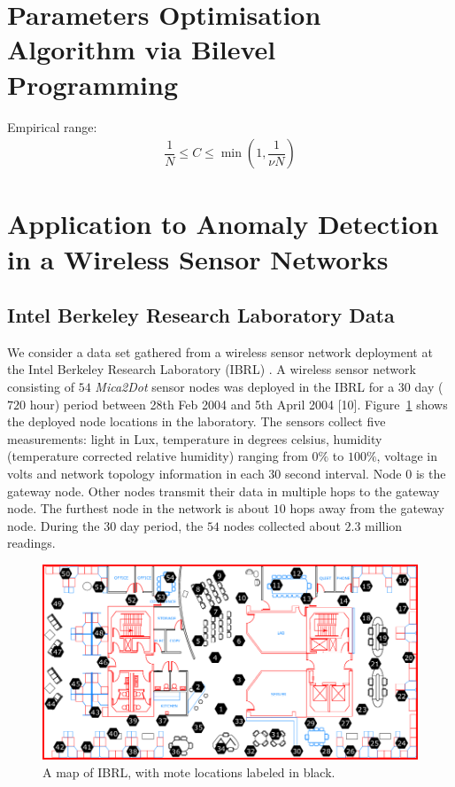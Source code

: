 \documentclass[3p,times]{elsarticle}
\begin{document}
\section{Parameters Optimisation Algorithm via Bilevel Programming}

\cite{theissler2013autonomously}

Empirical range:
\begin{align}
\dfrac{1}{N} \le C \le \min \left( 1, \dfrac{1}{\nu N} \right)
\end{align}

\section{Application to Anomaly Detection in a Wireless Sensor Networks}

\subsection{Intel Berkeley Research Laboratory Data}

We consider a data set gathered from a wireless sensor network deployment at the Intel Berkeley Research Laboratory (IBRL) \cite{Buonadonna2005}. A wireless sensor network consisting of $54$ \emph{Mica2Dot} sensor nodes was deployed in the IBRL for a $30$ day ($720$ hour) period between 28th Feb 2004 and 5th April 2004 [10]. Figure~\ref{fig:ibrl_wsn} shows the deployed node locations in the laboratory. The sensors collect five measurements: light in Lux, temperature in degrees celsius, humidity (temperature corrected relative humidity) ranging from $0\%$ to $100\%$, voltage in volts and network topology information in each $30$ second interval. Node $0$ is the gateway node. Other nodes transmit their data in multiple hops to the gateway node. The furthest node in the network is about $10$ hops away from the gateway node. During the $30$ day period, the $54$ nodes collected about $2.3$ million readings.

\begin{figure}[H]
\centering
\includegraphics[scale=.3]{Pictures/ibrl_wsn}
\caption{A map of IBRL, with mote locations labeled in black.}
\label{fig:ibrl_wsn}
\end{figure}
\end{document}
